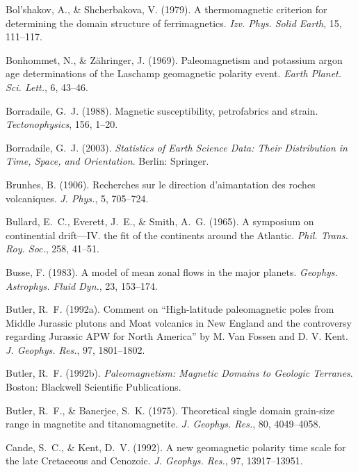 \documentclass[,plain]{tauxe}
\begin{document}
\begin{thebibliography}{}
\bibitem{}%
Bol'shakov, A., \& Shcherbakova, V. (1979). A thermomagnetic criterion for determining the domain structure of ferrimagnetics. {\it Izv. Phys. Solid Earth}, 15, 111--117.

\bibitem{}%
Bonhommet, N., \& Z\"ahringer, J. (1969). Paleomagnetism and potassium argon age determinations of the Laschamp geomagnetic polarity event. {\it Earth Planet. Sci. Lett.}, 6, 43--46.

\bibitem{}%
Borradaile, G.~J. (1988). Magnetic susceptibility, petrofabrics and strain. {\it Tectonophysics}, 156, 1--20.

\bibitem{}%
Borradaile, G.~J. (2003).
{\it Statistics of Earth Science Data: Their Distribution in Time, Space, and Orientation}. Berlin: Springer.

\bibitem{}%
Brunhes, B. (1906).
Recherches sur le direction d'aimantation des roches volcaniques.
{\it J. Phys.}, 5, 705--724.

\bibitem{}%
Bullard, E.~C., Everett, J.~E., \& Smith, A.~G. (1965).
A symposium on continential drift---IV. the fit of the continents around the Atlantic.
{\it Phil. Trans. Roy. Soc.}, 258, 41--51.

\bibitem{}%
Busse, F. (1983).
A model of mean zonal flows in the major planets.
{\it Geophys. Astrophys. Fluid Dyn.}, 23, 153--174.

\bibitem{}%
Butler, R.~F. (1992a).
Comment on ``High-latitude paleomagnetic poles from Middle Jurassic
plutons and Moat volcanics in New England and the controversy regarding Jurassic {APW} for North America'' by {M}. Van Fossen and {D}. {V}. Kent.
{\it J. Geophys. Res.}, 97, 1801--1802.

\bibitem{}%
Butler, R.~F. (1992b).
{\it Paleomagnetism: Magnetic Domains to Geologic Terranes}.
Boston: Blackwell Scientific Publications.

\bibitem{}%
Butler, R.~F., \& Banerjee, S.~K. (1975).
Theoretical single domain grain-size range in magnetite and titanomagnetite.
{\it J. Geophys. Res.}, 80, 4049--4058.

\bibitem{}%
Cande, S.~C., \& Kent, D.~V. (1992).
A new geomagnetic polarity time scale for the late Cretaceous and Cenozoic.
{\it J. Geophys. Res.}, 97, 13917--13951.


\end{thebibliography}
\end{document}

